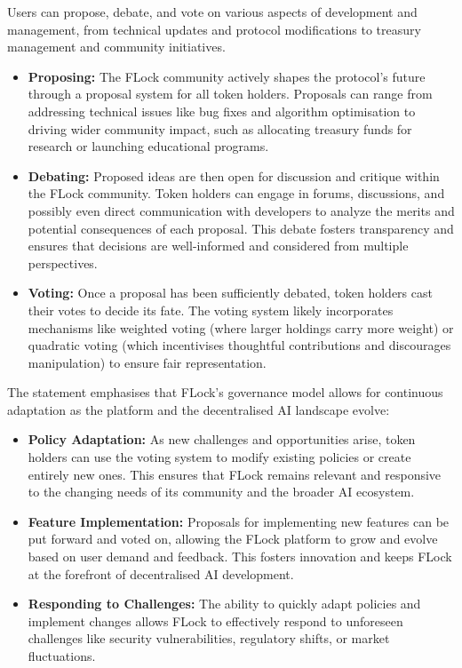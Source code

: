 \documentclass[conference]{IEEEtran}
\begin{document}
Users can propose, debate, and vote on various aspects of  development and management, from technical updates and protocol modifications to treasury management and community initiatives. 
\begin{itemize}
    \item \textbf{Proposing:} The FLock community actively shapes the protocol's future through a proposal system for all token holders.  Proposals can range from addressing technical issues like bug fixes and algorithm optimisation to driving wider community impact, such as allocating treasury funds for research or launching educational programs.
    \item \textbf{Debating:} Proposed ideas are then open for discussion and critique within the FLock community. Token holders can engage in forums, discussions, and possibly even direct communication with developers to analyze the merits and potential consequences of each proposal. This debate fosters transparency and ensures that decisions are well-informed and considered from multiple perspectives.
    \item \textbf{Voting:} Once a proposal has been sufficiently debated, token holders cast their votes to decide its fate. The voting system likely incorporates mechanisms like weighted voting (where larger holdings carry more weight) or quadratic voting (which incentivises thoughtful contributions and discourages manipulation) to ensure fair representation.
\end{itemize}
The statement emphasises that FLock's governance model allows for
continuous adaptation as the platform and the decentralised AI landscape evolve:

\begin{itemize}
    \item \textbf{Policy Adaptation:} As new challenges and opportunities arise, token holders can use the voting system to modify existing policies or create entirely new ones. This ensures that FLock remains relevant and responsive to the changing needs of its community and the broader AI ecosystem.
    \item \textbf{Feature Implementation:} Proposals for implementing new features can be put forward and voted on, allowing the FLock platform to grow and evolve based on user demand and feedback. This fosters innovation and keeps FLock at the forefront of decentralised AI development.
    \item \textbf{Responding to Challenges:} The ability to quickly adapt policies and implement changes allows FLock to effectively respond to unforeseen challenges like security vulnerabilities, regulatory shifts, or market fluctuations.
\end{itemize}
\end{document}
